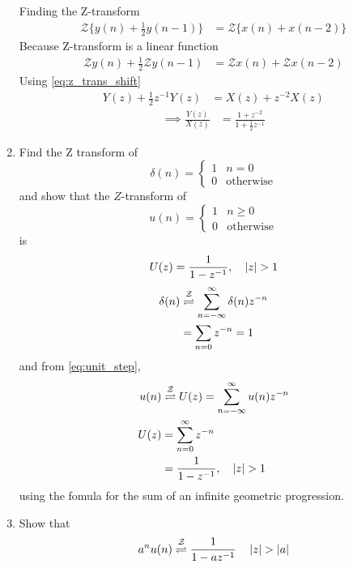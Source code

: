 \documentclass[journal,12pt,twocolumn]{IEEEtran}
\renewcommand\thesection{\arabic{section}}
\begin{document}
\begin{enumerate}[label=\thesection.\arabic*]
Finding the Z-transform 
\begin{align}
  {\mathcal {Z}}\{y(n) + \frac{1}{2}y(n-1)\} &= {\mathcal {Z}}\{x(n)+x(n-2)\}
\end{align}
Because Z-transform is a linear function
\begin{align}
  {\mathcal {Z}}y(n) + \frac{1}{2}{\mathcal {Z}}y(n-1) &= {\mathcal {Z}}x(n)+{\mathcal {Z}}x(n-2)
\end{align}
Using \eqref{eq:z_trans_shift}
\begin{align}
  Y(z) + \frac{1}{2}z^{-1}Y(z) &= X(z)+z^{-2}X(z)
\end{align}
\begin{align}
\implies \frac{Y(z)}{X(z)} &= \frac{1 + z^{-2}}{1 + \frac{1}{2}z^{-1}}
\label{eq:freq_resp}
\end{align}
\item Find the Z transform of 
\begin{equation}
\delta(n)
=
\begin{cases}
1 & n = 0
\\
0 & \text{otherwise}
\end{cases}
\end{equation}
and show that the $Z$-transform of
\begin{equation}
\label{eq:unit_step}
u(n)
=
\begin{cases}
1 & n \ge 0
\\
0 & \text{otherwise}
\end{cases}
\end{equation}
is
\begin{equation}
U(z) = \frac{1}{1-z^{-1}}, \quad \left\vert z\right\vert > 1
\end{equation}
\solution 
\begin{align}
\delta(n) &\overset{\mathcal{Z}}{ \rightleftharpoons} \sum _{n=-\infty }^{\infty }\delta(n)z^{-n}\\
&= \sum _{n=0}z^{-n} = 1
\end{align}
and from \eqref{eq:unit_step},
\begin{align}
u(n) &\overset{\mathcal{Z}}{ \rightleftharpoons} U(z) = \sum _{n=-\infty }^{\infty }u(n)z^{-n}\\
U(z) &= \sum _{n= 0}^{\infty}z^{-n}\\
&=\frac{1}{1-z^{-1}}, \quad \left\vert z\right\vert > 1
\end{align}
using the fomula for the sum of an infinite geometric progression.
%
\item Show that 
\begin{equation}
\label{eq:anun}
a^nu(n) \overset{\mathcal{Z}}{ \rightleftharpoons} \frac{1}{1-az^{-1}} \quad \left\vert z\right\vert > \left\vert a\right\vert
\end{equation}

\end{enumerate}
\end{document}
